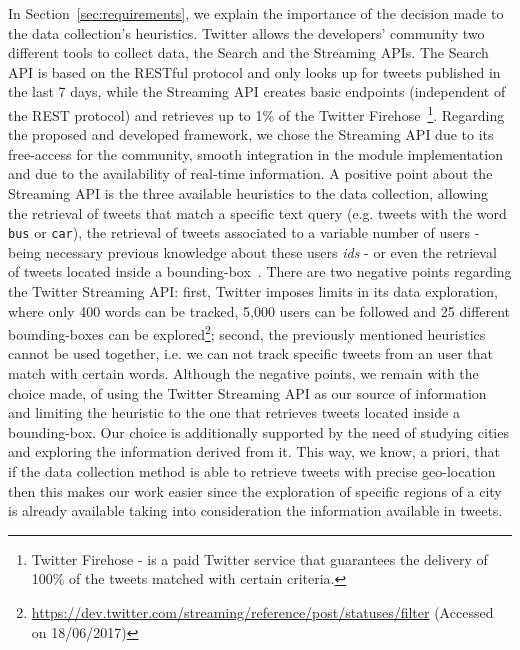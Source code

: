 In Section~\ref{sec:requirements}, we explain the importance of the decision made to the data collection's heuristics. Twitter allows the developers' community two different tools to collect data, the Search and the Streaming \glspl{API}. The Search API is based on the RESTful protocol and only looks up for tweets published in the last 7 days, while the Streaming API creates basic endpoints (independent of the REST protocol) and retrieves up to 1\% of the Twitter Firehose~\footnote{Twitter Firehose - is a paid Twitter service that guarantees the delivery of 100\% of the tweets matched with certain criteria.}. Regarding the proposed and developed framework, we chose the Streaming API due to its free-access for the community, smooth integration in the module implementation and due to the availability of real-time information. A positive point about the Streaming API is the three available heuristics to the data collection, allowing the retrieval of tweets that match a specific text query (e.g. tweets with the word \texttt{bus} or \texttt{car}), the retrieval of tweets associated to a variable  number of users - being necessary previous knowledge about these users \textit{ids} - or even the retrieval of tweets located inside a bounding-box~\cite{mac2016effects}. There are two negative points regarding the Twitter Streaming API: first, Twitter imposes limits in its data exploration, where only 400 words can be tracked, 5,000 users can be followed and 25 different bounding-boxes can be explored\footnote{\url{https://dev.twitter.com/streaming/reference/post/statuses/filter} (Accessed on 18/06/2017)}; second, the previously mentioned heuristics cannot be used together, i.e. we can not track specific tweets from an user that match with certain words. Although the negative points, we remain with the choice made, of using the Twitter Streaming API as our source of information and limiting the heuristic to the one that retrieves tweets located inside a bounding-box. Our choice is additionally supported by the need of studying cities and exploring the information derived from it. This way, we know, a priori, that if the data collection method is able to retrieve tweets with precise geo-location then this makes our work easier since the exploration of specific regions of a city is already available taking into consideration the information available in tweets.

